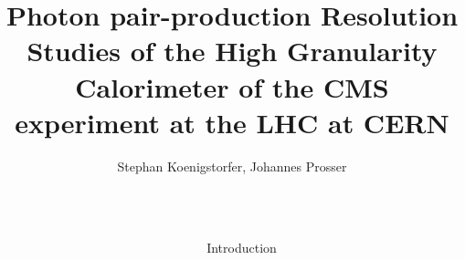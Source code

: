 \documentclass[final,hyperref={pdfpagelabels=false}]{beamer}
\title{\huge Photon pair-production Resolution Studies of the High Granularity Calorimeter of the CMS experiment at the LHC at CERN} %
\author{Stephan Koenigstorfer, Johannes Prosser} %
\institute{Imperial College London, High Energy Physics Group} %
\begin{document}

\begin{frame}[t] %

\begin{columns}[t] %

\begin{column}{.02\textwidth}\end{column} %

\begin{column}{.465\textwidth} %


\begin{block}{Introduction}


\end{block}
\end{column}
\end{columns}
\end{frame}
\end{document}
